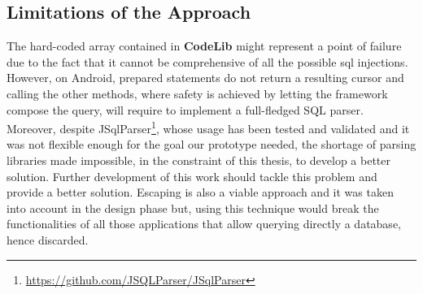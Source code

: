 \subsection{Limitations of the Approach}
The hard-coded array contained in \textbf{CodeLib} might represent a point of failure due to the fact that it cannot be comprehensive of all the possible sql injections. However, on Android, prepared statements do not return a resulting cursor and calling the other methods, where safety is achieved by letting the framework compose the query, will require to implement a full-fledged SQL parser. Moreover, despite JSqlParser\footnote{\url{https://github.com/JSQLParser/JSqlParser}}, whose usage has been tested and validated and it was not flexible enough for the goal our prototype needed, the shortage of parsing libraries made impossible, in the constraint of this thesis, to develop a better solution. Further development of this work should tackle this problem and provide a better solution. Escaping is also a viable approach and it was taken into account in the design phase but, using this technique would break the functionalities of all those applications that allow querying directly a database, hence discarded.

